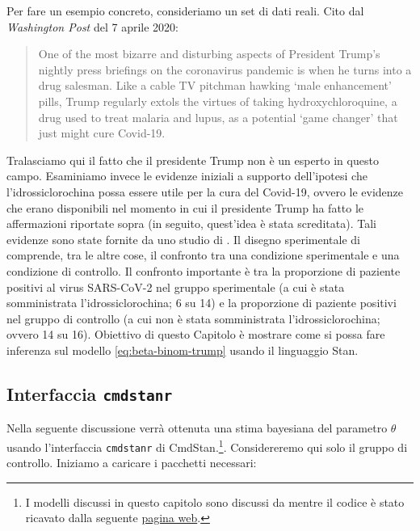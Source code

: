 \documentclass[
  11pt,
  italian,
  a4paper,
  extrafontsizes,onecolumn,openright
  ]{memoir}
\newlength{\rf}
\begin{document}
Per fare un esempio concreto, consideriamo un set di dati reali. Cito dal \emph{Washington Post} del 7 aprile 2020:

\begin{quote}
One of the most bizarre and disturbing aspects of President Trump's nightly press briefings on the coronavirus pandemic is when he turns into a drug salesman. Like a cable TV pitchman hawking `male enhancement' pills, Trump regularly extols the virtues of taking hydroxychloroquine, a drug used to treat malaria and lupus, as a potential `game changer' that just might cure Covid-19.
\end{quote}

Tralasciamo qui il fatto che il presidente Trump non è un esperto in questo campo. Esaminiamo invece le evidenze iniziali a supporto dell'ipotesi che l'idrossiclorochina possa essere utile per la cura del Covid-19, ovvero le evidenze che erano disponibili nel momento in cui il presidente Trump ha fatto le affermazioni riportate sopra (in seguito, quest'idea è stata screditata). Tali evidenze sono state fornite da uno studio di \textcite{Gautret_2020}.
Il disegno sperimentale di \textcite{Gautret_2020} comprende, tra le altre cose, il confronto tra una condizione sperimentale e una condizione di controllo. Il confronto importante è tra la proporzione di paziente positivi al virus SARS-CoV-2 nel gruppo sperimentale (a cui è stata somministrata l'idrossiclorochina; 6 su 14) e la proporzione di paziente positivi nel gruppo di controllo (a cui non è stata somministrata l'idrossiclorochina; ovvero 14 su 16). Obiettivo di questo Capitolo è mostrare come si possa fare inferenza sul modello \eqref{eq:beta-binom-trump} usando il linguaggio Stan.

\hypertarget{cmdstanr-gautret}{%
\subsection{\texorpdfstring{Interfaccia \texttt{cmdstanr}}{Interfaccia cmdstanr}}\label{cmdstanr-gautret}}

Nella seguente discussione verrà ottenuta una stima bayesiana del parametro \(\theta\) usando l'interfaccia \texttt{cmdstanr} di CmdStan.\footnote{I modelli discussi in questo capitolo sono discussi da \textcite{gelman1995bayesian} mentre il codice è stato ricavato dalla seguente \href{http://avehtari.github.io/BDA_R_demos/demos_rstan/rstan_demo.html}{pagina web}.}. Considereremo qui solo il gruppo di controllo. Iniziamo a caricare i pacchetti necessari:
\end{document}
